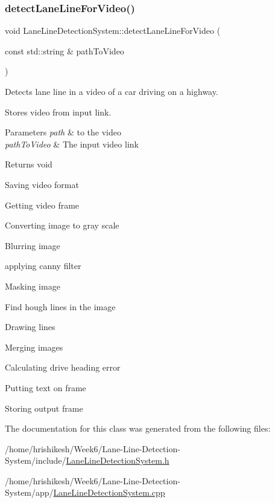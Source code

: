 \subsubsection{\texorpdfstring{detect\+Lane\+Line\+For\+Video()}{detectLaneLineForVideo()}}
{\footnotesize\ttfamily void Lane\+Line\+Detection\+System\+::detect\+Lane\+Line\+For\+Video (\begin{DoxyParamCaption}\item[{const std\+::string \&}]{path\+To\+Video }\end{DoxyParamCaption})}



Detects lane line in a video of a car driving on a highway. 

Stores video from input link.


\begin{DoxyParams}{Parameters}
{\em path} & to the video\\
\hline
{\em path\+To\+Video} & The input video link\\
\hline
\end{DoxyParams}
\begin{DoxyReturn}{Returns}
void 
\end{DoxyReturn}
Saving video format

Getting video frame

Converting image to gray scale

Blurring image

applying canny filter

Masking image

Find hough lines in the image

Drawing lines

Merging images

Calculating drive heading error

Putting text on frame

Storing output frame 

The documentation for this class was generated from the following files\+:\begin{DoxyCompactItemize}
\item 
/home/hrishikesh/\+Week6/\+Lane-\/\+Line-\/\+Detection-\/\+System/include/\mbox{\hyperlink{_lane_line_detection_system_8h}{Lane\+Line\+Detection\+System.\+h}}\item 
/home/hrishikesh/\+Week6/\+Lane-\/\+Line-\/\+Detection-\/\+System/app/\mbox{\hyperlink{_lane_line_detection_system_8cpp}{Lane\+Line\+Detection\+System.\+cpp}}\end{DoxyCompactItemize}
